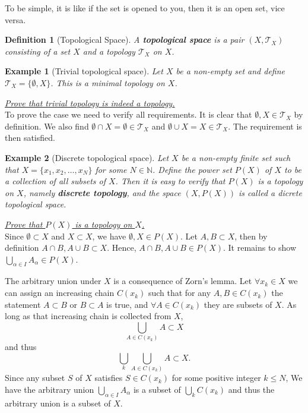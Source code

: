 \documentclass[12pt]{article}
\newtheorem{definition}{Definition}[section]
\newtheorem*{example}{Example}
\renewenvironment{proof}[1][Proof]{\begin{snugshade*} \underline{\textit{{#1}.}}\\}{\hfill \qedsymbol \end{snugshade*}}
\begin{document}
    To be simple, it is like if the set is opened to you, then it is an open set, vice versa.

    \begin{definition}[Topological Space]
        A \textbf{topological space} is a pair $(X,\mathcal{T}_X)$ consisting of a set $X$ and a topology $\mathcal{T}_X$ on $X$.
    \end{definition}

    \begin{example}[Trivial topological space]
        Let $X$ be a non-empty set and define $\mathcal{T}_X=\{\emptyset, X\}$. This is a minimal topology on $X$.
    \end{example}

    \begin{proof}[Prove that trivial topology is indeed a topology]
        To prove the case we need to verify all requirements. It is clear that $\emptyset, X\in\mathcal{T}_X$ by definition. We also find $\emptyset\cap X=\emptyset\in\mathcal{T}_X$ and $\emptyset\cup X = X\in\mathcal{T}_X$. The requirement is then satisfied.
    \end{proof}

    \begin{example}[Discrete topological space]
        Let $X$ be a non-empty finite set such that $X=\{x_1,x_2,\dots,x_N\}$ for some $N\in\mathbb{N}$. Define the power set $P(X)$ of $X$ to be a collection of all subsets of $X$. Then it is easy to verify that $P(X)$ is a topology on $X$, namely \textbf{discrete topology}, and the space $(X,P(X))$ is called a dicrete topological space.
    \end{example}

    \begin{proof}[Prove that $P(X)$ is a topology on $X$]
        Since $\emptyset\subset X$ and $X\subset X$, we have $\emptyset, X\in P(X)$. Let $A,B\subset X$, then by definition $A\cap B, A\cup B\subset X$. Hence, $A\cap B, A\cup B\in P(X)$. It remains to show $\bigcup_{\alpha\in I}A_{\alpha}\in P(X)$.

        The arbitrary union under $X$ is a consequence of Zorn's lemma. Let $\forall x_k\in X$ we can assign an increasing chain $C(x_k)$ such that for any $A,B\in C(x_k)$ the statement $A\subset B$ or $B\subset A$ is true, and $\forall A\in C(x_k)$ they are subsets of $X$. As long as that increasing chain is collected from $X$, \[\bigcup_{A\in C(x_k)}A\subset X\] and thus \[\bigcup_k \bigcup_{A\in C(x_k)}A\subset X.\] Since any subset $S$ of $X$ satisfies $S\in C(x_k)$ for some positive integer $k\leq N$, We have the arbitrary union $\bigcup_{\alpha\in I} A_{\alpha}$ is a subset of $\bigcup_k C(x_k)$ and thus the arbitrary union is a subset of $X$.
    \end{proof}
\end{document}

